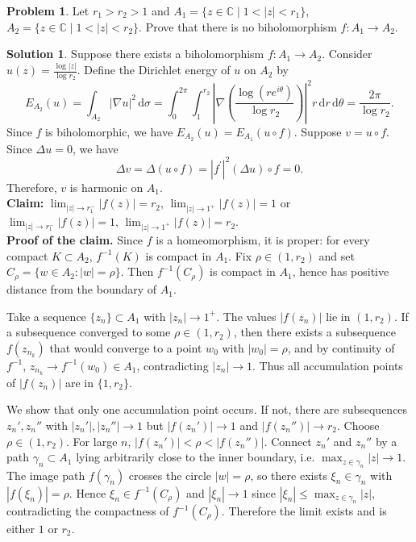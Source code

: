 \documentclass{article}
\theoremstyle{definition}
\newtheorem{problem}{Problem}
\newtheorem{solution}{Solution}
\newcommand{\C}{\mathbb{C}}
\newcommand{\dd}{\mathrm{d}}
\renewcommand{\leq}{\leqslant}
\begin{document}
\begin{problem}
    Let $r_1>r_2>1$ and $A_1=\{z\in \C\mid 1<|z|<r_1\}$, $A_2=\{z\in \C\mid 1<|z|<r_2\}$. Prove that there is no biholomorphism $f\colon A_1\to A_2$.
\end{problem}
\begin{solution}
    Suppose there exists a biholomorphism $f\colon A_1\to A_2$. Consider $u(z)=\frac{\log |z|}{\log r_2}$. Define the Dirichlet energy of $u$ on $A_2$ by 
    \[E_{A_2}(u)=\int_{A_2}|\nabla u|^2 \, \dd\sigma=\int_{0}^{2\pi}\int_{1}^{r_2} \left|\nabla \left(\frac{\log(re^{i\theta})}{\log r_2}\right)\right|^2 r \,\dd r \,\dd\theta=\frac{2\pi}{\log r_2}.\]
    Since $f$ is biholomorphic, we have \(E_{A_2}(u)=E_{A_1}(u\circ f)\). Suppose $v=u\circ f$. Since $\Delta u=0$, we have
    \[\Delta v=\Delta (u\circ f)=|f^{\prime}|^2 (\Delta u)\circ f=0.\]
    Therefore, $v$ is harmonic on $A_1$. \\[2mm]
    \textbf{Claim:} $\lim_{|z|\to r_1^-}|f(z)|=r_2,\,\lim_{|z|\to 1^+}|f(z)|=1$ or $\lim_{|z|\to r_1^-}|f(z)|=1,\,\lim_{|z|\to 1^+}|f(z)|=r_2$.\\[2mm]
    \noindent\textbf{Proof of the claim.} Since $f$ is a homeomorphism, it is proper: for every compact $K\subset A_2$, $f^{-1}(K)$ is compact in $A_1$. Fix $\rho\in(1,r_2)$ and set $C_\rho=\{w\in A_2: |w|=\rho\}$. Then $f^{-1}(C_\rho)$ is compact in $A_1$, hence has positive distance from the boundary of $A_1$.

Take a sequence $\{z_n\}\subset A_1$ with $|z_n|\to 1^+$. The values $|f(z_n)|$ lie in $(1,r_2)$. If a subsequence converged to some $\rho\in(1,r_2)$, then there exists a subsequence $f(z_{n_k})$ that would converge to a point $w_0$ with $|w_0|=\rho$, and by continuity of $f^{-1}$, $z_{n_k}\to f^{-1}(w_0)\in A_1$, contradicting $|z_n|\to 1$. Thus all accumulation points of $|f(z_n)|$ are in $\{1,r_2\}$.

    We show that only one accumulation point occurs. If not, there are subsequences $z_n', z_n''$ with $|z_n'|,|z_n''|\to 1$ but $|f(z_n')|\to 1$ and $|f(z_n'')|\to r_2$. Choose $\rho\in(1,r_2)$. For large $n$, $|f(z_n')|<\rho<|f(z_n'')|$. Connect $z_n'$ and $z_n''$ by a path $\gamma_n\subset A_1$ lying arbitrarily close to the inner boundary, i.e. $\max_{z\in \gamma_n}|z|\to 1$. The image path $f(\gamma_n)$ crosses the circle $|w|=\rho$, so there exists $\xi_n\in \gamma_n$ with $|f(\xi_n)|=\rho$. Hence $\xi_n\in f^{-1}(C_\rho)$ and $|\xi_n|\to 1$ since $|\xi_n|\leq \max_{z\in \gamma_n}|z|$, contradicting the compactness of $f^{-1}(C_\rho)$. Therefore the limit exists and is either $1$ or $r_2$.


\end{solution}
\end{document}

